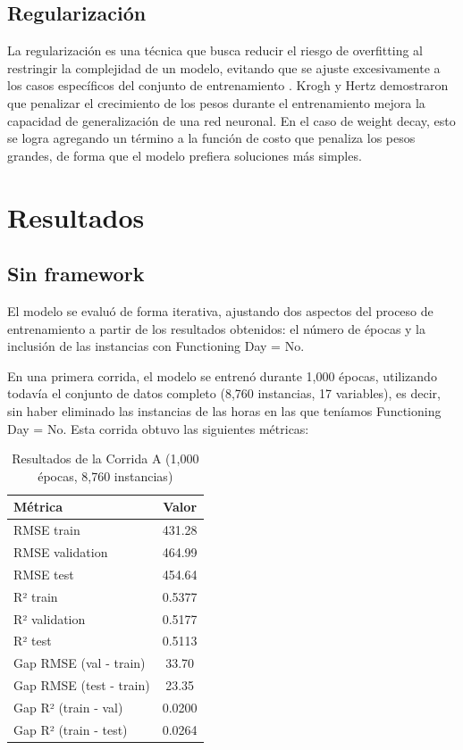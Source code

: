 \documentclass[10pt,journal,compsoc]{IEEEtran}
\begin{document}
\subsection{Regularización}

La regularización es una técnica que busca reducir el riesgo de overfitting al restringir la complejidad de un modelo, evitando que se ajuste excesivamente a los casos específicos del conjunto de entrenamiento \cite{ibm01}. Krogh y Hertz \cite{weight} demostraron que penalizar el crecimiento de los pesos durante el entrenamiento mejora la capacidad de generalización de una red neuronal. En el caso de weight decay, esto se logra agregando un término a la función de costo que penaliza los pesos grandes, de forma que el modelo prefiera soluciones más simples.

\section{Resultados}
\label{sec:resultados}
\subsection{Sin framework}
El modelo se evaluó de forma iterativa, ajustando dos aspectos del proceso de entrenamiento a partir de los resultados obtenidos: el número de épocas y la inclusión de las instancias con Functioning Day = No.

En una primera corrida, el modelo se entrenó durante 1,000 épocas, utilizando todavía el conjunto de datos completo (8,760 instancias, 17 variables), es decir, sin haber eliminado las instancias de las horas en las que teníamos Functioning Day = No. Esta corrida obtuvo las siguientes métricas:

\begin{table}[h]
\centering
\caption{Resultados de la Corrida A (1,000 épocas, 8,760 instancias)}
\label{tab:corridaA}
\begin{tabular}{|l|c|}
\hline
\textbf{Métrica} & \textbf{Valor} \\
\hline
RMSE train & 431.28 \\
RMSE validation & 464.99 \\
RMSE test & 454.64 \\
\hline
R² train & 0.5377 \\
R² validation & 0.5177 \\
R² test & 0.5113 \\
\hline
Gap RMSE (val - train) & 33.70 \\
Gap RMSE (test - train) & 23.35 \\
Gap R² (train - val) & 0.0200 \\
Gap R² (train - test) & 0.0264 \\
\hline
\end{tabular}
\end{table}
\end{document}
